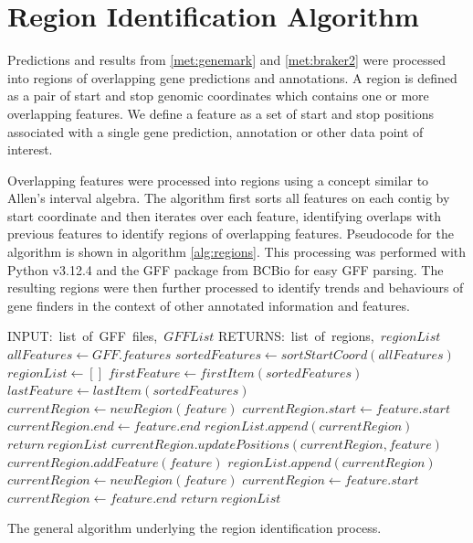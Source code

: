 \section{Region Identification Algorithm}
\label{section:region-met}

Predictions and results from \ref{met:genemark} and \ref{met:braker2}
were processed into regions of overlapping gene predictions and
annotations. A region is defined as a pair of start and stop genomic
coordinates which contains one or more overlapping features. We define
a feature as a set of start and stop positions associated with a
single gene prediction, annotation or other data point of interest.

Overlapping features were processed into regions using a concept
similar to Allen's interval algebra\cite{DECHTER2003333}. The
algorithm first sorts all features on each contig by start coordinate
and then iterates over each feature, identifying overlaps with
previous features to identify regions of overlapping
features. Pseudocode for the algorithm is shown in algorithm
\ref{alg:regions}. This processing was performed with Python
v3.12.4\cite{Foundation} and the GFF package from BCBio\cite{Chapman}
for easy GFF parsing.  The resulting regions were then further
processed to identify trends and behaviours of gene finders in the
context of other annotated information and features.

\begin{algorithm}
  \begin{algorithmic}
    \State INPUT:\ list\ of\ GFF\ files,\ $GFFList$
    \State RETURNS:\ list\ of\ regions,\ $regionList$
    \State $allFeatures \gets GFF.features$
    \EndFor
    \State $sortedFeatures \gets sortStartCoord(allFeatures)$
    \State $regionList \gets []$
    \State $firstFeature \gets firstItem(sortedFeatures)$
    \State $lastFeature \gets lastItem(sortedFeatures)$
        \State $currentRegion \gets newRegion(feature)$
        \State $currentRegion.start \gets feature.start$
        \State $currentRegion.end \gets feature.end$
        \State $regionList.append(currentRegion)$
        \State $return\ regionList$
        \State $currentRegion.updatePositions(currentRegion, feature)$
        \State $currentRegion.addFeature(feature)$
      \Else
        \State $regionList.append(currentRegion)$
        \State $currentRegion \gets newRegion(feature)$
        \State $currentRegion \gets feature.start$
        \State $currentRegion \gets feature.end$
      \EndIf
    \EndFor
    \State $return\ regionList$
  \end{algorithmic}
  \caption{The general algorithm underlying the region identification
    process.}
  \label{alg:regions}
\end{algorithm}

